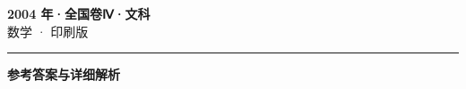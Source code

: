 \documentclass[zihao=5, a4paper]{ctexart}
\begin{document}
\begin{center}
  {\Large\bfseries 2004 年·全国卷Ⅳ·文科}\\[4pt]
  {\large 数学 · 印刷版}
\end{center}
\medskip
{}

\par\bigskip\hrule\bigskip
{}
\begin{center}{\large\bfseries 参考答案与详细解析}\end{center}
\smallskip

\end{document}
